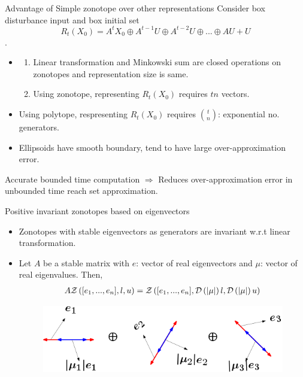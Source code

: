 \begin{frame}{Advantage of Simple zonotope over other representations}
Consider {\color{purple} box disturbance input} and {\color{purple}
box initial set}
%
{\color{purple} \[ R_t(X_0)  = A^tX_0\oplus A^{t-1}U\oplus
A^{t-2}U\oplus ...\oplus AU+U\].}\vspace{-2em}
%
\begin{itemize}
\item
\begin{enumerate}
\item   {\color{blue} Linear transformation} and
{\color{blue} Minkowski sum} are {\color{blue} closed operations on zonotopes} and
{\color{blue} representation size is same}.
\item {\color{blue} Using zonotope}, representing $R_t(X_0)$ requires {\color{blue} $tn$} vectors.
\end{enumerate}
\item {\color{purple} Using polytope}, respresenting $R_t(X_0)$
requires {\color{purple}$t\choose n$: exponential} no. generators.
\item {\color{purple} Ellipsoids have smooth boundary}, tend to have
{\color{purple} large
over-approximation error}.
\end{itemize}
%
{\color{black} Accurate bounded time computation} $\Rightarrow$
{\color{black} Reduces
over-approximation error in unbounded time reach set approximation}.
\end{frame}

%
\begin{frame}{Positive invariant zonotopes based on eigenvectors}
\begin{itemize}
\item {\color{blue}Zonotopes} with {\color{blue} stable eigenvectors as generators} are
{\color{blue} invariant} w.r.t linear transformation.
\item Let {\color{blue} $A$} be a {\color{blue}stable matrix} with
{\color{blue}$e$: vector of real eigenvectors} and {\color{blue}$\mu$:
vector of real eigenvalues}.  Then,
%
{\color{purple}
\begin{align*}
 A\mathcal{Z}\left([e_1,...,e_n],l,u\right)   = \mathcal{Z}\left([e_1,...,e_n],\mathcal{D}\left(\left|\mu\right|\right)l,\mathcal{D}\left(\left|\mu\right|\right)u\right)
\end{align*}
}
%
\begin{figure}
\includegraphics[scale=0.5]{figures/contraction-zonotope.png}
\end{figure}
%
\end{itemize}
\end{frame}


